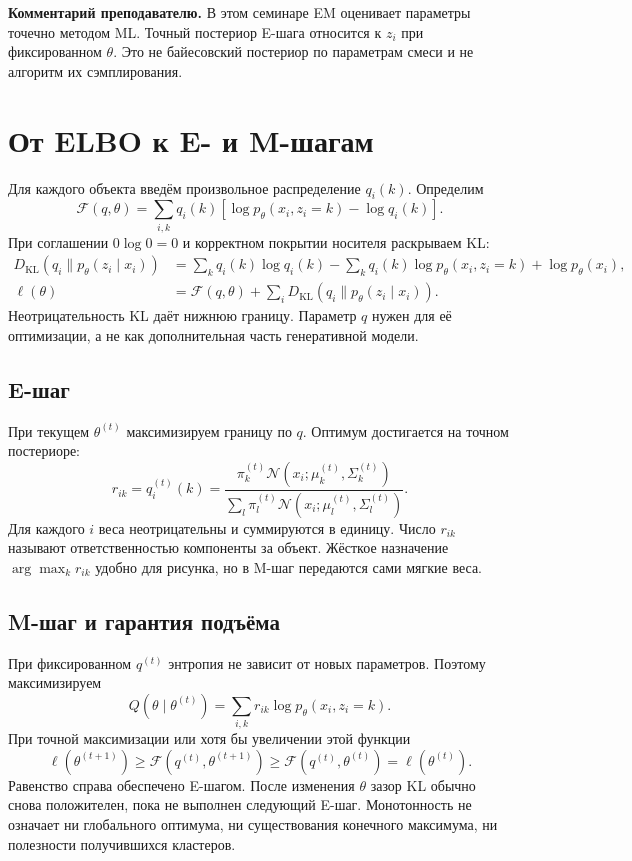 \documentclass[11pt,a4paper]{article}
\newcommand{\Normal}{\mathcal N}
\newcommand{\KL}{D_{\mathrm{KL}}}
\newcommand{\teach}[1]{\par\textbf{Комментарий преподавателю.} #1\par}
\begin{document}
\teach{В этом семинаре EM оценивает параметры точечно методом ML.
Точный постериор E-шага относится к $z_i$ при фиксированном $\theta$.
Это не байесовский постериор по параметрам смеси и не алгоритм их сэмплирования.}

\section{От ELBO к E- и M-шагам}

Для каждого объекта введём произвольное распределение $q_i(k)$.
Определим
\[
 \mathcal F(q,\theta)=\sum_{i,k}q_i(k)
 [\log p_\theta(x_i,z_i=k)-\log q_i(k)].
\]
При соглашении $0\log0=0$ и корректном покрытии носителя раскрываем KL:
\begin{align*}
 \KL(q_i\|p_\theta(z_i\mid x_i))
 &=\sum_kq_i(k)\log q_i(k)
   -\sum_kq_i(k)\log p_\theta(x_i,z_i=k)+\log p_\theta(x_i),\\
 \ell(\theta)&=\mathcal F(q,\theta)
       +\sum_i\KL(q_i\|p_\theta(z_i\mid x_i)).
\end{align*}
Неотрицательность KL даёт нижнюю границу. Параметр $q$ нужен для её
оптимизации, а не как дополнительная часть генеративной модели.

\subsection{E-шаг}
При текущем $\theta^{(t)}$ максимизируем границу по $q$.
Оптимум достигается на точном постериоре:
\[
 r_{ik}=q_i^{(t)}(k)=
 \frac{\pi_k^{(t)}\Normal(x_i;\mu_k^{(t)},\Sigma_k^{(t)})}
 {\sum_l\pi_l^{(t)}\Normal(x_i;\mu_l^{(t)},\Sigma_l^{(t)})}.
\]
Для каждого $i$ веса неотрицательны и суммируются в единицу.
Число $r_{ik}$ называют ответственностью компоненты за объект.
Жёсткое назначение $\arg\max_k r_{ik}$ удобно для рисунка, но в M-шаг
передаются сами мягкие веса.

\subsection{M-шаг и гарантия подъёма}
При фиксированном $q^{(t)}$ энтропия не зависит от новых параметров.
Поэтому максимизируем
\[
 Q(\theta\mid\theta^{(t)})=
 \sum_{i,k}r_{ik}\log p_\theta(x_i,z_i=k).
\]
При точной максимизации или хотя бы увеличении этой функции
\[
 \ell(\theta^{(t+1)})
 \geq\mathcal F(q^{(t)},\theta^{(t+1)})
 \geq\mathcal F(q^{(t)},\theta^{(t)})
 =\ell(\theta^{(t)}).
\]
Равенство справа обеспечено E-шагом. После изменения $\theta$ зазор KL
обычно снова положителен, пока не выполнен следующий E-шаг.
Монотонность не означает ни глобального оптимума, ни существования
конечного максимума, ни полезности получившихся кластеров.
\end{document}
